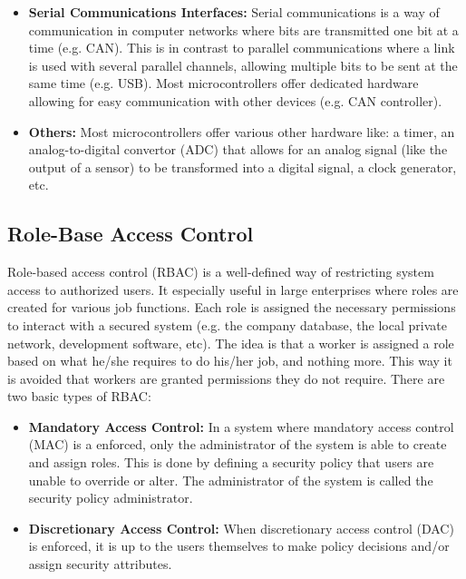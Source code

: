\documentclass[11pt]{article}
\begin{document}
\begin{itemize}
	\item \textbf{Serial Communications Interfaces:} Serial communications is a way of communication in computer networks where bits are transmitted one bit at a time (e.g. CAN). This is in contrast to parallel communications where a link is used with several parallel channels, allowing multiple bits to be sent at the same time (e.g. USB). Most microcontrollers offer dedicated hardware allowing for easy communication with other devices (e.g. CAN controller).
	
	\item \textbf{Others:} Most microcontrollers offer various other hardware like: a timer, an analog-to-digital convertor (ADC) that allows for an analog signal (like the output of a sensor) to be transformed into a digital signal, a clock generator, etc.
\end{itemize}

\subsection{Role-Base Access Control}
\label{sec:RBAC}

Role-based access control (RBAC) is a well-defined way of restricting system access to authorized users. It especially useful in large enterprises where roles are created for various job functions. Each role is assigned the necessary permissions to interact with a secured system (e.g. the company database, the local private network, development software, etc). The idea is that a worker is assigned a role based on what he/she requires to do his/her job, and nothing more. This way it is avoided that workers are granted permissions they do not require. There are two basic types of RBAC:

\begin{itemize}
	\item \textbf{Mandatory Access Control:} In a system where mandatory access control (MAC) is a enforced, only the administrator of the system is able to create and assign roles. This is done by defining a security policy that users are unable to override or alter. The administrator of the system is called the security policy administrator.
	
	\item \textbf{Discretionary Access Control:} When discretionary access control (DAC) is enforced, it is up to the users themselves to make policy decisions and/or assign security attributes.
\end{itemize}
\end{document}
